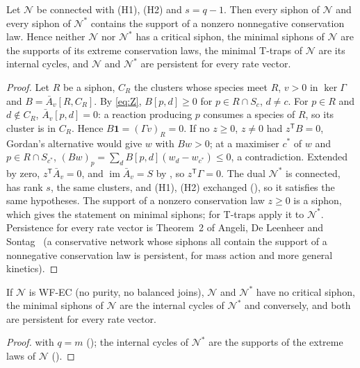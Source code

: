 \documentclass[11pt,a4paper]{report}
\newcommand{\Net}{\mathcal{N}}
\newcommand{\Nd}{\mathcal{N}^{*}}
\newcommand{\im}{\operatorname{im}}
\newcommand{\tp}{^{\mathsf T}}
\begin{document}
\begin{theorem}\label{thm:Cgen}
Let \(\Net\) be connected with (H1), (H2) and \(s=q-1\). Then every siphon of \(\Net\) and every siphon of \(\Nd\)
contains the support of a nonzero nonnegative conservation law. Hence neither \(\Net\) nor \(\Nd\) has a critical
siphon, the minimal siphons of \(\Net\) are the supports of its extreme conservation laws, the minimal T-traps of
\(\Net\) are its internal cycles, and \(\Net\) and \(\Nd\) are persistent for every rate vector.
\end{theorem}
\begin{proof}
Let \(R\) be a siphon, \(C_R\) the clusters whose species meet \(R\), \(v>0\) in \(\ker\Gamma\) and
\(B=\bar A_v[R,C_R]\). By \eqref{eq:Z}, \(B[p,d]\ge0\) for \(p\in R\cap S_c\), \(d\ne c\). For \(p\in R\) and \(d\notin
C_R\), \(\bar A_v[p,d]=0\): a reaction producing \(p\) consumes a species of \(R\), so its cluster is in \(C_R\). Hence
\(B\mathbf 1=(\Gamma v)_R=0\). If no \(z\ge0\), \(z\ne0\) had \(z\tp B=0\), Gordan's alternative would give \(w\) with
\(Bw>0\); at a maximiser \(c^*\) of \(w\) and \(p\in R\cap S_{c^*}\), \((Bw)_p=\sum_dB[p,d](w_d-w_{c^*})\le0\), a
contradiction. Extended by zero, \(z\tp\bar A_v=0\), and \(\im\bar A_v=S\) by , so \(z\tp\Gamma=0\). The
dual \(\Nd\) is connected, has rank \(s\), the same clusters, and (H1), (H2) exchanged (), so it
satisfies the same hypotheses. The support of a nonzero conservation law \(z\ge0\) is a siphon, which gives the
statement on minimal siphons; for T-traps apply it to \(\Nd\). Persistence for every rate vector is Theorem~2 of
Angeli, De Leenheer and Sontag~\autocite{AngeliDeLeenheerSontag2007} (a conservative network whose siphons all
contain the support of a nonnegative conservation law is persistent, for mass action and more general kinetics).
\end{proof}

\begin{corollary}\label{cor:C}
If \(\Net\) is WF-EC (no purity, no balanced joins), \(\Net\) and \(\Nd\) have no critical siphon, the minimal siphons
of \(\Net\) are the internal cycles of \(\Nd\) and conversely, and both are persistent for every rate vector.
\end{corollary}
\begin{proof}
 with \(q=m\) (); the internal cycles of \(\Nd\) are the supports of the extreme laws
of \(\Net\) ().
\end{proof}
\end{document}
